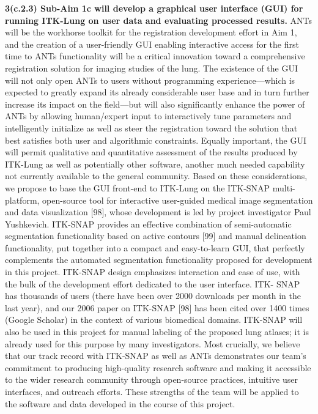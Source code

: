 \documentclass[11pt,]{article}
\begin{document}
\textbf{3(c.2.3) Sub-Aim 1c will develop a graphical user interface
(GUI) for running ITK-Lung on user data and evaluating processed
results.} ANTs will be the workhorse toolkit for the registration
development effort in Aim 1, and the creation of a user-friendly GUI
enabling interactive access for the first time to ANTs functionality
will be a critical innovation toward a comprehensive registration
solution for imaging studies of the lung. The existence of the GUI will
not only open ANTs to users without programming experience---which is
expected to greatly expand its already considerable user base and in
turn further increase its impact on the field---but will also
significantly enhance the power of ANTs by allowing human/expert input
to interactively tune parameters and intelligently initialize as well as
steer the registration toward the solution that best satisfies both user
and algorithmic constraints. Equally important, the GUI will permit
qualitative and quantitative assessment of the results produced by
ITK-Lung as well as potentially other software, another much needed
capability not currently available to the general community. Based on
these considerations, we propose to base the GUI front-end to ITK-Lung
on the ITK-SNAP multi-platform, open-source tool for interactive
user-guided medical image segmentation and data visualization {[}98{]},
whose development is led by project investigator Paul Yushkevich.
ITK-SNAP provides an effective combination of semi-automatic
segmentation functionality based on active contours {[}99{]} and manual
delineation functionality, put together into a compact and easy-to-learn
GUI, that perfectly complements the automated segmentation functionality
proposed for development in this project. ITK-SNAP design emphasizes
interaction and ease of use, with the bulk of the development effort
dedicated to the user interface. ITK- SNAP has thousands of users (there
have been over 2000 downloads per month in the last year), and our 2006
paper on ITK-SNAP {[}98{]} has been cited over 1400 times (Google
Scholar) in the context of various biomedical domains. ITK-SNAP will
also be used in this project for manual labeling of the proposed lung
atlases; it is already used for this purpose by many investigators. Most
crucially, we believe that our track record with ITK-SNAP as well as
ANTs demonstrates our team's commitment to producing high-quality
research software and making it accessible to the wider research
community through open-source practices, intuitive user interfaces, and
outreach efforts. These strengths of the team will be applied to the
software and data developed in the course of this project.
\end{document}
